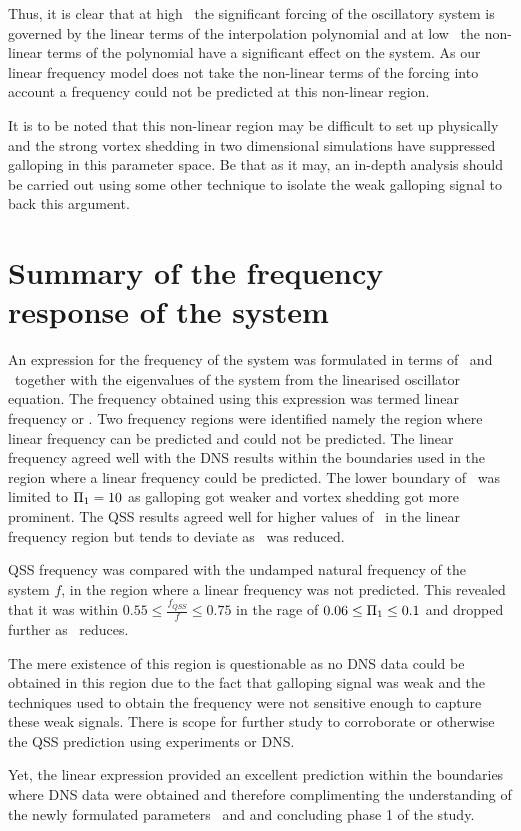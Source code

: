 Thus, it is clear that at high \massstiff\, the significant forcing of the oscillatory system is governed by the linear terms of the interpolation polynomial and at low \massstiff\, the non-linear terms of the polynomial have a significant effect on the system. As our linear frequency model does not take the non-linear terms of the forcing into account a frequency could not be predicted at this non-linear region.  	

It is to be noted that this non-linear region may be difficult to set up physically and the strong vortex shedding in two dimensional simulations have suppressed galloping in this parameter space. Be that as it may, an in-depth analysis should be carried out using some other technique to isolate the weak galloping signal to back this argument. 

\section{Summary of the frequency response of the system}

An expression for the frequency of the system was formulated in terms of \massstiff\ and \massdamp\ together with the eigenvalues of the system from the linearised oscillator equation. The frequency obtained using this expression was termed linear frequency or \freqlin. Two frequency regions were identified namely the region where linear frequency can be predicted and could not be predicted. The linear frequency agreed well with the DNS results within the boundaries used in the region where a linear frequency could be predicted. The lower boundary of \massstiff\ was limited to $\Pi_1=10$ as galloping got weaker and vortex shedding got more prominent. The QSS results agreed well for higher values of \massstiff\ in the linear frequency region but tends to deviate as \massstiff\ was reduced. 

QSS frequency was compared with the undamped natural frequency of the system $f$, in the region where a linear frequency was not predicted. This revealed that it was within $0.55\leq\frac{f_{QSS}}{f}\leq0.75$ in the rage of $0.06\leq\Pi_1\leq0.1$ and dropped further as \massstiff\ reduces.  

The mere existence of this region is questionable as no DNS data could be obtained in this region due to the fact that galloping signal was weak and the techniques used to obtain the  frequency were not sensitive enough to capture these weak signals. There is scope for further study to corroborate or otherwise the QSS prediction using experiments or DNS. 

Yet, the linear expression provided an excellent prediction within the boundaries where DNS data were obtained and therefore complimenting the understanding of the newly formulated parameters \massstiff\ and \massdamp and concluding phase 1 of the study.

   




